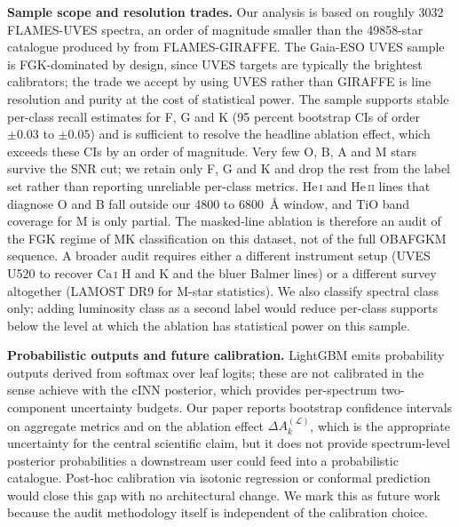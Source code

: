 \documentclass[11pt,a4paper]{article}
\newcommand{\CaI}{Ca\,\textsc{i}\xspace}
\newcommand{\HeI}{He\,\textsc{i}\xspace}
\newcommand{\HeII}{He\,\textsc{ii}\xspace}
\newcommand{\dA}{\Delta A}
\begin{document}
\textbf{Sample scope and resolution trades.} Our analysis is based on roughly 3032 FLAMES-UVES spectra, an order of magnitude smaller than the 49858-star catalogue produced by \citet{2024A&A...692A.228C} from FLAMES-GIRAFFE. The Gaia-ESO UVES sample is FGK-dominated by design, since UVES targets are typically the brightest calibrators; the trade we accept by using UVES rather than GIRAFFE is line resolution and purity at the cost of statistical power. The sample supports stable per-class recall estimates for F, G and K (95 percent bootstrap CIs of order $\pm 0.03$ to $\pm 0.05$) and is sufficient to resolve the headline ablation effect, which exceeds these CIs by an order of magnitude. Very few O, B, A and M stars survive the SNR cut; we retain only F, G and K and drop the rest from the label set rather than reporting unreliable per-class metrics. \HeI and \HeII lines that diagnose O and B fall outside our 4800 to 6800~\AA{} window, and TiO band coverage for M is only partial. The masked-line ablation is therefore an audit of the FGK regime of MK classification on this dataset, not of the full OBAFGKM sequence. A broader audit requires either a different instrument setup (UVES U520 to recover \CaI H and K and the bluer Balmer lines) or a different survey altogether (LAMOST DR9 for M-star statistics). We also classify spectral class only; adding luminosity class as a second label would reduce per-class supports below the level at which the ablation has statistical power on this sample.

\textbf{Probabilistic outputs and future calibration.} LightGBM emits probability outputs derived from softmax over leaf logits; these are not calibrated in the sense \citet{2024A&A...692A.228C} achieve with the cINN posterior, which provides per-spectrum two-component uncertainty budgets. Our paper reports bootstrap confidence intervals on aggregate metrics and on the ablation effect $\dA_k^{(\mathcal{L})}$, which is the appropriate uncertainty for the central scientific claim, but it does not provide spectrum-level posterior probabilities a downstream user could feed into a probabilistic catalogue. Post-hoc calibration via isotonic regression or conformal prediction would close this gap with no architectural change. We mark this as future work because the audit methodology itself is independent of the calibration choice.
\end{document}
